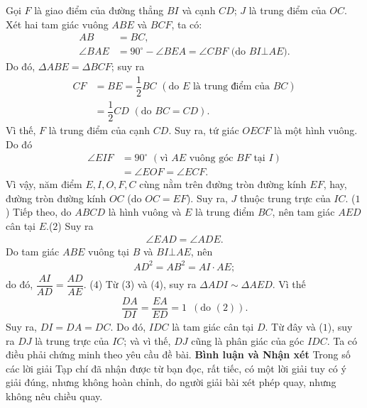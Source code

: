 \begin{multicols}{2}
\begin{center}
	\end{center}
	Gọi $F$ là giao điểm của đường thẳng $BI$ và cạnh $CD$; $J$ là trung điểm của $OC$.
	\vskip 0.05cm
	Xét hai tam giác vuông $ABE$ và $BCF$, ta có:
	\begin{align*}
		AB &= BC,\\
		\angle BAE \!&=\! {90^{\circ}} \!-\! \angle BEA \!=\! \angle CBF \,\, \text{(do $BI \bot AE$)}.
	\end{align*}
	Do đó, $\Delta ABE = \Delta BCF$; suy ra
	\begin{align*}
		CF &\!=\! BE \!=\! \dfrac{1}{2} BC \,\,(\text{do $E$ là trung điểm của $BC$})\\
		&\!=\! \dfrac{1}{2}CD \,\,(\text{do $BC = CD$}).
	\end{align*}
	Vì thế, $F$ là trung điểm của cạnh $CD$. Suy ra, tứ giác $OECF$ là một hình vuông. Do đó
	\begin{align*}
		\angle EIF &= 90^\circ \,\,(\text{vì $AE$ vuông góc $BF$ tại $I$})\\
		&= \angle EOF = \angle ECF.
	\end{align*}
	Vì vậy, năm điểm $E, I, O, F, C$ cùng nằm trên đường tròn đường kính $EF$, hay, đường tròn đường kính $OC$ (do $OC = EF$). Suy ra, $J$ thuộc trung trực của $IC$. \hfill ($1$)
	\vskip 0.05cm
	Tiếp theo, do $ABCD$ là hình vuông và $E$ là trung điểm $BC$, nên tam giác $AED$ cân \linebreak tại $E$.\hfill ($2$)
	\vskip 0.05cm
	Suy ra
	\begin{align*}
		\angle EAD = \angle ADE. \tag{$3$}
	\end{align*}
	Do tam giác $ABE$ vuông tại $B$ và $BI \bot AE$, nên
	\begin{align*}
		A{D^2} = A{B^2} = AI \cdot AE;
	\end{align*}
	do đó, $\dfrac{{AI}}{{AD}} = \dfrac{{AD}}{{AE}}$. \hfill ($4$)
	\vskip 0.05cm
	Từ ($3$) và ($4$), suy ra $\Delta ADI \sim \Delta AED$. Vì thế
	\begin{align*}
		\dfrac{{DA}}{{DI}} = \dfrac{{EA}}{{ED}} = 1\,\,\,({\text{do }}(2)).
	\end{align*}
	Suy ra, $DI = DA = DC$. Do đó, $IDC$ là tam giác cân tại $D$. Từ đây và ($1$), suy ra $DJ$ là trung trực của $IC$; và vì thế, $DJ$ cũng là phân giác của góc $IDC$. Ta có điều phải chứng minh theo yêu cầu đề bài.
	\vskip 0.05cm
	\textbf{\color{thachthuctoanhoc}Bình luận và Nhận xét}
	\vskip 0.05cm
	Trong số các lời giải Tạp chí đã nhận được từ bạn đọc, rất tiếc, có một lời giải tuy có ý giải đúng, nhưng không hoàn chỉnh, do người giải bài xét phép quay, nhưng không nêu chiều quay.

\end{multicols}
